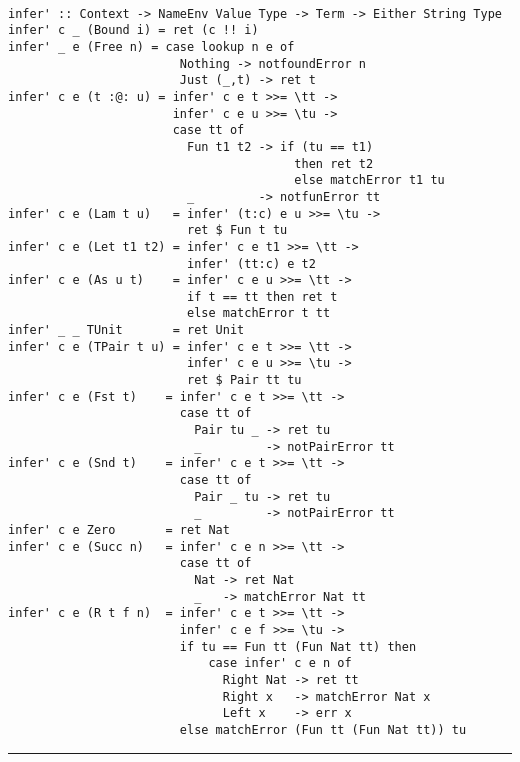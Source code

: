 \documentclass[a4paper]{article}
\begin{document}
\begin{lstlisting}

infer' :: Context -> NameEnv Value Type -> Term -> Either String Type
infer' c _ (Bound i) = ret (c !! i)
infer' _ e (Free n) = case lookup n e of
                        Nothing -> notfoundError n
                        Just (_,t) -> ret t
infer' c e (t :@: u) = infer' c e t >>= \tt ->
                       infer' c e u >>= \tu ->
                       case tt of
                         Fun t1 t2 -> if (tu == t1)
                                        then ret t2
                                        else matchError t1 tu
                         _         -> notfunError tt
infer' c e (Lam t u)   = infer' (t:c) e u >>= \tu ->
                         ret $ Fun t tu
infer' c e (Let t1 t2) = infer' c e t1 >>= \tt ->
                         infer' (tt:c) e t2
infer' c e (As u t)    = infer' c e u >>= \tt ->
                         if t == tt then ret t
                         else matchError t tt 
infer' _ _ TUnit       = ret Unit
infer' c e (TPair t u) = infer' c e t >>= \tt ->
                         infer' c e u >>= \tu ->
                         ret $ Pair tt tu
infer' c e (Fst t)    = infer' c e t >>= \tt ->
                        case tt of
                          Pair tu _ -> ret tu
                          _         -> notPairError tt
infer' c e (Snd t)    = infer' c e t >>= \tt ->
                        case tt of
                          Pair _ tu -> ret tu
                          _         -> notPairError tt
infer' c e Zero       = ret Nat
infer' c e (Succ n)   = infer' c e n >>= \tt ->
                        case tt of
                          Nat -> ret Nat
                          _   -> matchError Nat tt
infer' c e (R t f n)  = infer' c e t >>= \tt ->
                        infer' c e f >>= \tu ->
                        if tu == Fun tt (Fun Nat tt) then
                            case infer' c e n of
                              Right Nat -> ret tt
                              Right x   -> matchError Nat x
                              Left x    -> err x
                        else matchError (Fun tt (Fun Nat tt)) tu

\end{lstlisting}

\bigskip
\bigskip
\bigskip
\noindent\rule{16cm}{0.4pt}
\end{document}
